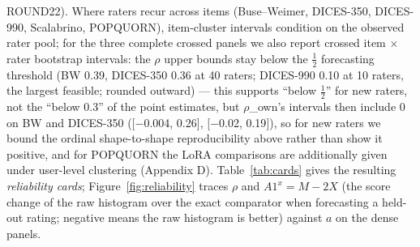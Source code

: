 \documentclass[10pt,twocolumn]{article}
\begin{document}
ROUND22). Where raters recur across items (Buse--Weimer, DICES-350, DICES-990, Scalabrino, POPQUORN), item-cluster intervals condition on the observed rater pool; for the three complete crossed panels we also report crossed item $\times$ rater bootstrap intervals: the $\rho$ upper bounds stay below the $\tfrac12$ forecasting threshold (BW 0.39, DICES-350 0.36 at 40 raters; DICES-990 0.10 at 10 raters, the largest feasible; rounded outward) --- this supports ``below $\tfrac12$'' for new raters, not the ``below 0.3'' of the point estimates, but $\rho$\_own's intervals then include 0 on BW and DICES-350 ({[}$-$0.004, 0.26{]}, {[}$-$0.02, 0.19{]}), so for new raters we bound the ordinal shape-to-shape reproducibility above rather than show it positive, and for POPQUORN the LoRA comparisons are additionally given under user-level clustering (Appendix D). Table~\ref{tab:cards} gives the resulting \emph{reliability cards}; Figure~\ref{fig:reliability} traces \(\rho\) and \(A1^x = M-2X\) (the score change of the raw histogram over the exact comparator when forecasting a held-out rating; negative means the raw histogram is better) against \(a\) on the dense panels.
\end{document}
